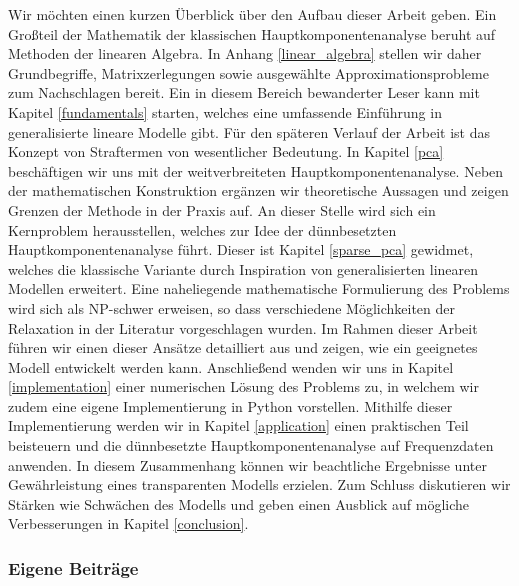 Wir möchten einen kurzen Überblick über den Aufbau dieser Arbeit geben. Ein Großteil der Mathematik der klassischen Hauptkomponentenanalyse beruht auf Methoden der linearen Algebra. In Anhang \ref{linear_algebra} stellen wir daher Grundbegriffe, Matrixzerlegungen sowie ausgewählte Approximationsprobleme zum Nachschlagen bereit. Ein in diesem Bereich bewanderter Leser kann mit Kapitel \ref{fundamentals} starten, welches eine umfassende Einführung in generalisierte lineare Modelle gibt. Für den späteren Verlauf der Arbeit ist das Konzept von Straftermen von wesentlicher Bedeutung. In Kapitel \ref{pca} beschäftigen wir uns mit der weitverbreiteten Hauptkomponentenanalyse. Neben der mathematischen Konstruktion ergänzen wir theoretische Aussagen und zeigen Grenzen der Methode in der Praxis auf. An dieser Stelle wird sich ein Kernproblem herausstellen, welches zur Idee der dünnbesetzten Hauptkomponentenanalyse führt. Dieser ist Kapitel \ref{sparse_pca} gewidmet, welches die klassische Variante durch Inspiration von generalisierten linearen Modellen erweitert. Eine naheliegende mathematische Formulierung des Problems wird sich als NP-schwer erweisen, so dass verschiedene Möglichkeiten der Relaxation in der Literatur vorgeschlagen wurden. Im Rahmen dieser Arbeit führen wir einen dieser Ansätze detailliert aus und zeigen, wie ein geeignetes Modell entwickelt werden kann. Anschließend wenden wir uns in Kapitel \ref{implementation} einer numerischen Lösung des Problems zu, in welchem wir zudem eine eigene Implementierung in Python vorstellen. Mithilfe dieser Implementierung werden wir in Kapitel \ref{application} einen praktischen Teil beisteuern und die dünnbesetzte Hauptkomponentenanalyse auf Frequenzdaten anwenden. In diesem Zusammenhang können wir beachtliche Ergebnisse unter Gewährleistung eines transparenten Modells erzielen. Zum Schluss diskutieren wir Stärken wie Schwächen des Modells und geben einen Ausblick auf mögliche Verbesserungen in Kapitel \ref{conclusion}.




\subsubsection{Eigene Beiträge}

